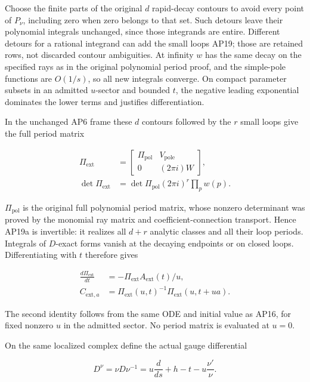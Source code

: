 Choose the finite parts of the original \(d\) rapid-decay contours to avoid every point of \(P_\nu\), including zero when zero belongs to that set. Such detours leave their polynomial integrals unchanged, since those integrands are entire. Different detours for a rational integrand can add the small loops AP19; those are retained rows, not discarded contour ambiguities. At infinity \(w\) has the same decay on the specified rays as in the original polynomial period proof, and the simple-pole functions are \(O(1/s)\), so all new integrals converge. On compact parameter subsets in an admitted \(u\)-sector and bounded \(t\), the negative leading exponential dominates the lower terms and justifies differentiation.

In the unchanged AP6 frame these \(d\) contours followed by the \(r\) small loops give the full period matrix

\[
\begin{aligned}
\Pi_{\mathrm{ext}}&=\begin{bmatrix}
\Pi_{\mathrm{pol}}&V_{\mathrm{pole}}\\0&(2\pi i)W
\end{bmatrix},\\
\det\Pi_{\mathrm{ext}}&=\det\Pi_{\mathrm{pol}}(2\pi i)^r\prod_p w(p).
\end{aligned}
\tag{AP19a}
\]

\(\Pi_{\mathrm{pol}}\) is the original full polynomial period matrix, whose nonzero determinant was proved by the monomial ray matrix and coefficient-connection transport. Hence AP19a is invertible: it realizes all \(d+r\) analytic classes and all their loop periods. Integrals of \(D\)-exact forms vanish at the decaying endpoints or on closed loops. Differentiating with \(t\) therefore gives

\[
\begin{aligned}
\frac{d\Pi_{\mathrm{ext}}}{dt}&=-\Pi_{\mathrm{ext}}A_{\mathrm{ext}}(t)/u,\\
C_{\mathrm{ext},a}&=\Pi_{\mathrm{ext}}(u,t)^{-1}\Pi_{\mathrm{ext}}(u,t+ua).
\end{aligned}
\tag{AP19b}
\]

The second identity follows from the same ODE and initial value as AP16, for fixed nonzero \(u\) in the admitted sector. No period matrix is evaluated at \(u=0\).

On the same localized complex define the actual gauge differential

\[
D^\nu=\nu D\nu^{-1}
=u\frac{d}{ds}+h-t-u\frac{\nu'}{\nu}.
\tag{AP20}
\]

